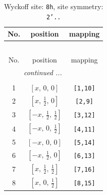 \documentclass[fleqn,8pt]{jsarticle}
\begin{document}
\begin{longtable}{ccc}
\caption{Wyckoff site: {\tt 8h}, site symmetry: {\tt 2'..}}
 \\
 \hline \hline
No. & position & mapping \\ \hline \endfirsthead

\multicolumn{2}{l}{\tablename\ \thetable{}} \\
 \hline \hline
No. & position & mapping \\ \hline \endhead

 \hline \hline
\multicolumn{2}{r}{\footnotesize\it continued ...} \\ \endfoot

 \hline \hline
\multicolumn{2}{r}{} \\ \endlastfoot

1 & $\left[ x,\, 0,\, 0 \right]$ & {\tt [1,10]} \\ \hline
2 & $\left[ x,\, \frac{1}{2},\, 0 \right]$ & {\tt [2,9]} \\ \hline
3 & $\left[ - x,\, \frac{1}{2},\, \frac{1}{2} \right]$ & {\tt [3,12]} \\ \hline
4 & $\left[ - x,\, 0,\, \frac{1}{2} \right]$ & {\tt [4,11]} \\ \hline
5 & $\left[ - x,\, 0,\, 0 \right]$ & {\tt [5,14]} \\ \hline
6 & $\left[ - x,\, \frac{1}{2},\, 0 \right]$ & {\tt [6,13]} \\ \hline
7 & $\left[ x,\, \frac{1}{2},\, \frac{1}{2} \right]$ & {\tt [7,16]} \\ \hline
8 & $\left[ x,\, 0,\, \frac{1}{2} \right]$ & {\tt [8,15]} \\
\end{longtable}
\renewcommand{\arraystretch}{1.2}
\end{document}
